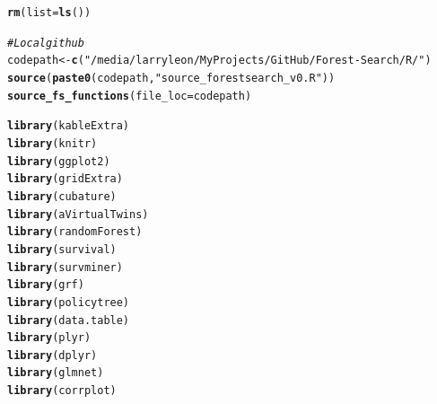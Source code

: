 \documentclass[smallextended]{svjour3}
\makeatletter
\newcommand{\hlstr}[1]{\textcolor[rgb]{0.192,0.494,0.8}{#1}}%
\newcommand{\hlcom}[1]{\textcolor[rgb]{0.678,0.584,0.686}{\textit{#1}}}%
\newcommand{\hlstd}[1]{\textcolor[rgb]{0.345,0.345,0.345}{#1}}%
\newcommand{\hlkwb}[1]{\textcolor[rgb]{0.69,0.353,0.396}{#1}}%
\newcommand{\hlkwc}[1]{\textcolor[rgb]{0.333,0.667,0.333}{#1}}%
\newcommand{\hlkwd}[1]{\textcolor[rgb]{0.737,0.353,0.396}{\textbf{#1}}}%
\newenvironment{kframe}{%
 \def\at@end@of@kframe{}%
 \ifinner\ifhmode%
  \def\at@end@of@kframe{\end{minipage}}%
  \begin{minipage}{\columnwidth}%
 \fi\fi%
 \def\FrameCommand##1{\hskip\@totalleftmargin \hskip-\fboxsep
 \colorbox{shadecolor}{##1}\hskip-\fboxsep
     \hskip-\linewidth \hskip-\@totalleftmargin \hskip\columnwidth}%
 \MakeFramed {\advance\hsize-\width
   \@totalleftmargin\z@ \linewidth\hsize
   \@setminipage}}%
 {\par\unskip\endMakeFramed%
 \at@end@of@kframe}
\newenvironment{knitrout}{}{} %
\makeatother
\begin{document}
\begin{knitrout}
\color{fgcolor}\begin{kframe}
\begin{alltt}
\hlkwd{rm}\hlstd{(}\hlkwc{list} \hlstd{=} \hlkwd{ls}\hlstd{())}

\hlcom{# Local github}
\hlstd{codepath} \hlkwb{<-} \hlkwd{c}\hlstd{(}\hlstr{"/media/larryleon/My Projects/GitHub/Forest-Search/R/"}\hlstd{)}
\hlkwd{source}\hlstd{(}\hlkwd{paste0}\hlstd{(codepath,} \hlstr{"source_forestsearch_v0.R"}\hlstd{))}
\hlkwd{source_fs_functions}\hlstd{(}\hlkwc{file_loc} \hlstd{= codepath)}

\hlkwd{library}\hlstd{(kableExtra)}
\hlkwd{library}\hlstd{(knitr)}
\hlkwd{library}\hlstd{(ggplot2)}
\hlkwd{library}\hlstd{(gridExtra)}
\hlkwd{library}\hlstd{(cubature)}
\hlkwd{library}\hlstd{(aVirtualTwins)}
\hlkwd{library}\hlstd{(randomForest)}
\hlkwd{library}\hlstd{(survival)}
\hlkwd{library}\hlstd{(survminer)}
\hlkwd{library}\hlstd{(grf)}
\hlkwd{library}\hlstd{(policytree)}
\hlkwd{library}\hlstd{(data.table)}
\hlkwd{library}\hlstd{(plyr)}
\hlkwd{library}\hlstd{(dplyr)}
\hlkwd{library}\hlstd{(glmnet)}
\hlkwd{library}\hlstd{(corrplot)}
\end{alltt}
\end{kframe}
\end{knitrout}
\end{document}
